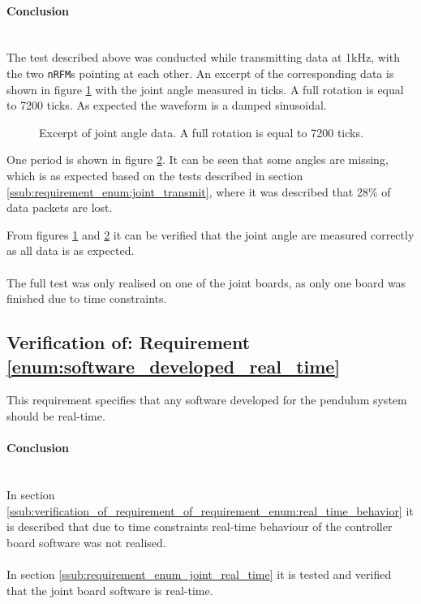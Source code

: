 \paragraph{Conclusion}~\\
The test described above was conducted while transmitting data at 1kHz, with the two \texttt{nRFM}s pointing at each other.
An excerpt of the corresponding data is shown in figure \ref{fig:joint_angle_measured_full} with the joint angle measured in ticks.
A full rotation is equal to 7200 ticks.
As expected the waveform is a damped sinusoidal.
\begin{figure}[h]
	\centering
	
	\caption[Excerpt of joint angle data]{Excerpt of joint angle data. A full rotation is equal to 7200 ticks.}
	\label{fig:joint_angle_measured_full}
\end{figure}
One period is shown in figure \ref{fig:joint_angle_measured_zoom}.
It can be seen that some angles are missing, which is as expected based on the tests described in section \ref{ssub:requirement_enum:joint_transmit}, where it was described that 28\% of data packets are lost.
\begin{figure}[h]
	\centering
	
	\caption{}
	\label{fig:joint_angle_measured_zoom}
\end{figure}
From figures \ref{fig:joint_angle_measured_full} and \ref{fig:joint_angle_measured_zoom} it can be verified that the joint angle are measured correctly as all data is as expected.
\\~\\
The full test was only realised on one of the joint boards, as only one board was finished due to time constraints.


\subsection{Verification of: Requirement \ref{enum:software_developed_real_time}} %
\label{sub:verification_of_requirement_enum:software_developed_real_time}
This requirement specifies that any software developed for the pendulum system should be real-time.

\paragraph{Conclusion}~\\
In section \ref{ssub:verification_of_requirement_of_requirement_enum:real_time_behavior} it is described that due to time constraints  real-time behaviour of the controller board software was not realised.
\\~\\
In section \ref{ssub:requirement_enum_joint_real_time} it is tested and verified that the joint board software is real-time.


